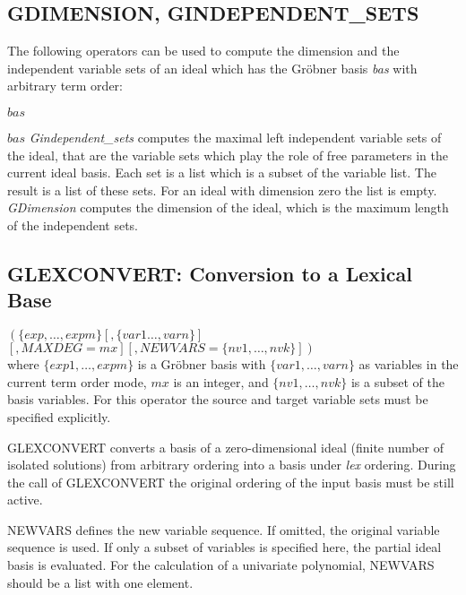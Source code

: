 \subsection{GDIMENSION, GINDEPENDENT\_SETS}
The following operators can be used to compute the dimension
and the independent variable sets of an ideal which has the
Gr\"obner basis {\it bas} with arbitrary term order:
\begin{description}
\item[Gdimension]$bas$
\item[Gindependent\_sets]$bas$
{\it Gindependent\_sets} computes the maximal
left independent variable sets of the ideal, that are
the variable sets which play the role of free parameters in the
current ideal basis.  Each set is a list which is a subset of the
variable list.  The result is a list of these sets.  For an
ideal with dimension zero the list is empty.
{\it GDimension} computes the dimension of the ideal,
which is the maximum length of the independent sets.
\end{description}

\subsection{GLEXCONVERT: Conversion to a Lexical Base}
\begin{description}
\item[{\it GLEXCONVERT}] $ \left(\{exp,\ldots , expm\} \left[,\{var1
\ldots , varn\}\right]\right.$ \\
$\left. \left[,MAXDEG=mx\right] \left[,NEWVARS=\{nv1, \ldots , nvk\}\right]\right) $ \\
where $\{exp1, \ldots , expm\}$ is a Gr\"obner basis with
$\{var1, \ldots , varn\}$ as variables in the current term order mode,
$mx$ is an integer, and
$\{nv1, \ldots , nvk\}$ is a subset of the basis variables.
For this operator the source and target variable sets must be specified
explicitly.
\end{description}

GLEXCONVERT converts a basis of a zero-dimensional ideal (finite number
of isolated solutions) from arbitrary ordering into a basis under {\it
lex} ordering.  During the call of GLEXCONVERT the original ordering of
the input basis must be still active.

NEWVARS defines the new variable sequence.  If omitted, the
original variable sequence is used.   If only a subset of variables is
specified here, the partial ideal basis is evaluated.  For the
calculation of a univariate polynomial, NEW\-VARS should be a list
with one element.

